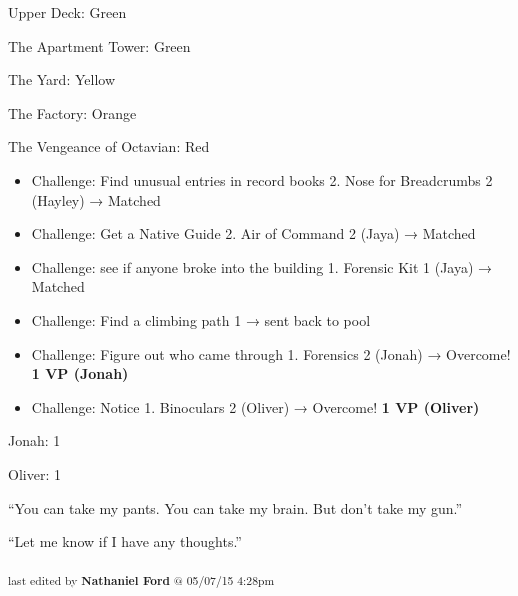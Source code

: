 {
\parskip=0pt
Upper Deck: Green

The Apartment Tower: Green

The Yard: Yellow

The Factory: Orange

The Vengeance of Octavian: Red
}




{
\parskip=0pt
\begin{itemize}
\item Challenge: Find unusual entries in record books 2.  Nose for Breadcrumbs 2 (Hayley) → Matched
\item Challenge: Get a Native Guide 2.  Air of Command 2 (Jaya) → Matched
\item Challenge: see if anyone broke into the building 1. Forensic Kit 1 (Jaya) → Matched
\item Challenge: Find a climbing path 1 → sent back to pool
\item Challenge: Figure out who came through 1.  Forensics 2 (Jonah) → Overcome! \textbf{1 VP (Jonah)}
\item Challenge: Notice 1.  Binoculars 2 (Oliver) → Overcome! \textbf{1 VP (Oliver)}
\end{itemize}
}



{
\parskip=0pt
Jonah: 1

Oliver: 1
}


``You can take my pants.  You can take my brain.  But don't take my gun.''




``Let me know if I have any thoughts.''



\vspace{\fill}

\begin{flushright}
\textsubscript{last edited by \textbf{Nathaniel Ford} @ 05/07/15 4:28pm}
\end{flushright}


